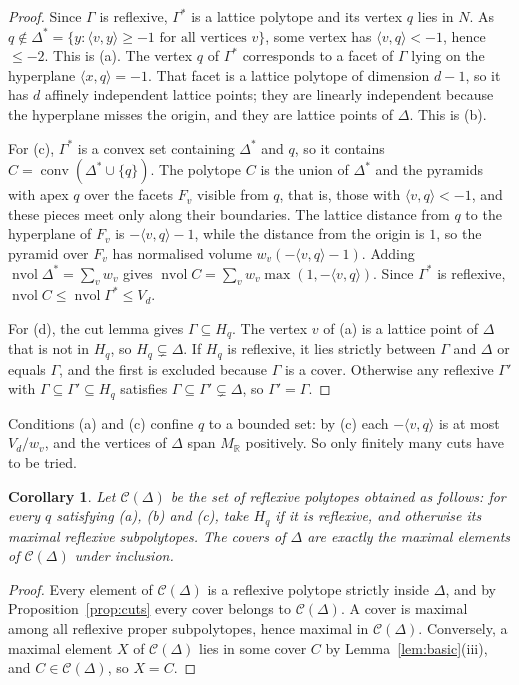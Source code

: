 \documentclass[manuscript]{aomart}
\newtheorem{corollary}[theorem]{Corollary}
\theoremstyle{definition}
\theoremstyle{remark}
\newcommand{\R}{\mathbb{R}}
\newcommand{\ip}[2]{\langle #1,#2\rangle}
\newcommand{\conv}{\operatorname{conv}}
\newcommand{\nvol}{\operatorname{nvol}}
\begin{document}
\begin{proof}
Since $\Gamma$ is reflexive, $\Gamma^*$ is a lattice polytope and its
vertex $q$ lies in $N$. As $q\notin\Delta^*=\{y:\ip{v}{y}\ge-1\text{ for
all vertices }v\}$, some vertex has $\ip{v}{q}<-1$, hence $\le-2$. This is
(a). The vertex $q$ of $\Gamma^*$ corresponds to a facet of $\Gamma$ lying
on the hyperplane $\ip{x}{q}=-1$. That facet is a lattice polytope of
dimension $d-1$, so it has $d$ affinely independent lattice points; they
are linearly independent because the hyperplane misses the origin, and
they are lattice points of $\Delta$. This is (b).

For (c), $\Gamma^*$ is a convex set containing $\Delta^*$ and $q$, so it
contains $C=\conv(\Delta^*\cup\{q\})$. The polytope $C$ is the union of
$\Delta^*$ and the pyramids with apex $q$ over the facets $F_v$ visible
from $q$, that is, those with $\ip{v}{q}<-1$, and these pieces meet only
along their boundaries. The lattice distance from $q$ to the hyperplane of
$F_v$ is $-\ip{v}{q}-1$, while the distance from the origin is $1$, so the
pyramid over $F_v$ has normalised volume $w_v(-\ip{v}{q}-1)$. Adding
$\nvol\Delta^*=\sum_v w_v$ gives $\nvol C=\sum_v w_v\max(1,-\ip{v}{q})$.
Since $\Gamma^*$ is reflexive, $\nvol C\le\nvol\Gamma^*\le V_d$.

For (d), the cut lemma gives $\Gamma\subseteq H_q$. The vertex $v$ of (a)
is a lattice point of $\Delta$ that is not in $H_q$, so
$H_q\subsetneq\Delta$. If $H_q$ is reflexive, it lies strictly
between $\Gamma$ and $\Delta$ or equals $\Gamma$, and the first is excluded
because $\Gamma$ is a cover. Otherwise any reflexive $\Gamma'$ with
$\Gamma\subseteq\Gamma'\subseteq H_q$ satisfies
$\Gamma\subseteq\Gamma'\subsetneq\Delta$, so $\Gamma'=\Gamma$.
\end{proof}

Conditions (a) and (c) confine $q$ to a bounded set: by (c) each
$-\ip{v}{q}$ is at most $V_d/w_v$, and the vertices of $\Delta$ span $M_\R$
positively. So only finitely many cuts have to be tried.

\begin{corollary}\label{cor:covers}
Let $\mathcal{C}(\Delta)$ be the set of reflexive polytopes obtained as
follows: for every $q$ satisfying (a), (b) and (c), take $H_q$ if it
is reflexive, and otherwise its maximal reflexive subpolytopes. The covers
of $\Delta$ are exactly the maximal elements of $\mathcal{C}(\Delta)$
under inclusion.
\end{corollary}

\begin{proof}
Every element of $\mathcal{C}(\Delta)$ is a reflexive polytope strictly
inside $\Delta$, and by Proposition~\ref{prop:cuts} every cover belongs to
$\mathcal{C}(\Delta)$. A cover is maximal among all reflexive proper
subpolytopes, hence maximal in $\mathcal{C}(\Delta)$. Conversely, a maximal
element $X$ of $\mathcal{C}(\Delta)$ lies in some cover $C$ by
Lemma~\ref{lem:basic}(iii), and $C\in\mathcal{C}(\Delta)$, so $X=C$.
\end{proof}
\end{document}
